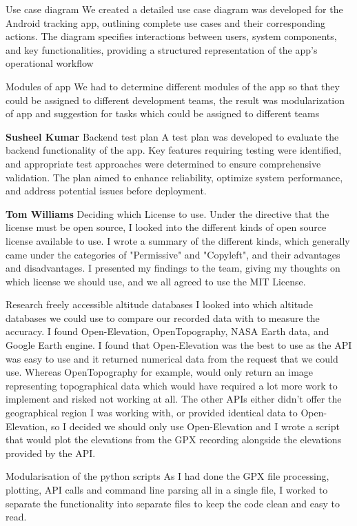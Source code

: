 \documentclass[12pt]{article}
\begin{document}
Use case diagram
We created a detailed use case diagram was developed for the Android tracking app, outlining complete use cases and their corresponding actions. The diagram specifies interactions between users, system components, and key functionalities, providing a structured representation of the app’s operational workflow

Modules of app
We had to determine different modules of the app so that they could be assigned to different development teams, the result was modularization of app and suggestion for tasks which could be assigned to different teams

{\large\textbf{Susheel Kumar}}
Backend test plan
A test plan was developed to evaluate the backend functionality of the app. Key features requiring testing were identified, and appropriate test approaches were determined to ensure comprehensive validation. The plan aimed to enhance reliability, optimize system performance, and address potential issues before deployment.

{\large\textbf{Tom Williams}}
Deciding which License to use.
Under the directive that the license must be open source, I looked into the different kinds of open source license available to use. I wrote a summary of the different kinds, which generally came under the categories of "Permissive" and "Copyleft", and their advantages and disadvantages. I presented my findings to the team, giving my thoughts on which license we should use, and we all agreed to use the MIT License.

Research freely accessible altitude databases
I looked into which altitude databases we could use to compare our recorded data with to measure the accuracy. I found Open-Elevation, OpenTopography, NASA Earth data, and Google Earth engine. I found that Open-Elevation was the best to use as the API was easy to use and it returned numerical data from the request that we could use. Whereas OpenTopography for example, would only return an image representing topographical data which would have required a lot more work to implement and risked not working at all. The other APIs either didn't offer the geographical region I was working with, or provided identical data to Open-Elevation, so I decided we should only use Open-Elevation and I wrote a script that would plot the elevations from the GPX recording alongside the elevations provided by the API.

Modularisation of the python scripts
As I had done the GPX file processing, plotting, API calls and command line parsing all in a single file, I worked to separate the functionality into separate files to keep the code clean and easy to read.
\end{document}
